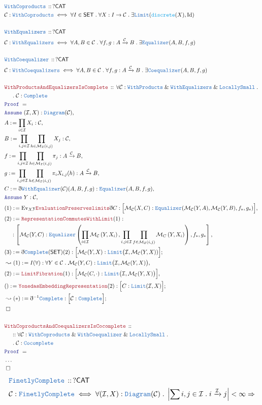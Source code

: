 \documentclass[12pt]{scrartcl}
\newcommand{\TYPE}[1]{\textcolor{NavyBlue}{\mathtt{#1}}}
\newcommand{\FUNC}[1]{\textcolor{Cerulean}{\mathtt{#1}}}
\newcommand{\LOGIC}[1]{\textcolor{Blue}{\mathtt{#1}}}
\newcommand{\THM}[1]{\textcolor{Maroon}{\mathtt{#1}}}
\renewcommand{\.}{\; . \;}
\newcommand{\de}{: \kern 0.1pc =}
\newcommand{\Theorem}[2]{& \THM{#1} \, :: \, #2 \\ & \Proof = \\ }
\newcommand{\DeclareType}[2]{& \TYPE{#1} \, :: \, #2 \\}
\newcommand{\DefineType}[3]{& #1 : \TYPE{#2} \iff #3 \\}
\newcommand{\NewLine}{\\ & \kern 1pc}
\newcommand{\Page}[1]{ \begin{align*} #1 \end{align*}   }
\newcommand{ \bd }{ \ByDef }
\newcommand{\NoProof}{ & \ldots \\ \EndProof}
\renewcommand{\And}{\; \& \;}
\newcommand{\Mor}{\mathcal{M}}
\newcommand{\Arrow}{\xrightarrow}
\newcommand{\Say}[3]{& #1 \de #2 : #3, \\}
\newcommand{\Conclude}[3]{& #1 \de #2 : #3; \\}
\newcommand{\Derive}[3]{& \leadsto #1 \de #2 : #3, \\}
\newcommand{\DeriveConclude}[3]{& \leadsto #1 \de #2 : #3 ; \\}
\newcommand{\Assume}[2]{& \LOGIC{Assume} \; #1 : #2, \\}
\newcommand{\QED}{\; \square}
\newcommand{\EndProof}{& \QED \\}
\newcommand{\ByDef}{\eth}
\newcommand{\Proof}{\LOGIC{Proof} \; }
\newcommand{\C}{\mathcal{C}}
\newcommand{\I}{\mathcal{I}}
\newcommand{\CAT}{\mathsf{CAT}}
\newcommand{\SET}{\mathsf{SET}}
\begin{document}
\Page{
	\DeclareType{WithCoproducts}{?\CAT}
	\DefineType{\C}{WithCoproducts}{
		\forall I \in \SET \.
		\forall X : I \to \C \.
		\exists \TYPE{Limit}(\FUNC{discrete}(X),\mathrm{Id})
	}
	\\
	\DeclareType{WithEqualizers}{?\CAT}
	\DefineType{\C}{WithEqualizers}{
		\forall A,B \in \C \. 
		\forall f,g : A \Arrow{\C} B \.
		\exists \TYPE{Equalizer}(A,B,f,g)
	}
	\\
	\DeclareType{WithCoequalizer}{?\CAT}
	\DefineType{\C}{WithCoequalizers}{
		\forall A,B \in \C \.
		\forall f,g : A \Arrow{\C} B \.
		\exists \TYPE{Coequalizer}(A,B,f,g)
	}
	\\
	\Theorem{WithProductsAndEqualizersIsComplete}
	{
		\forall \C : \TYPE{WithProducts} \And \TYPE{WithEqualizers} \And \TYPE{LocallySmall} \.
		\NewLine \.
		\C : \TYPE{Complete}
	}
	\Assume{(\I,X)}{\TYPE{Diagram}(\C)}
	\Say{A}{\prod_{i \in \I} X_i}{\C}
	\Say{B}{\prod_{i,j \in \I} \prod_{h \in \Mor_\I(i,j)} X_j  }{\C}
	\Say{f}{ \prod_{i,j \in \I} \prod_{h \in \Mor_\I(i,j)} \pi_j  }{ A \Arrow{\C} B}
	\Say{g}{\prod_{i,j \in \I} \prod_{h \in \Mor_\I(i,j)} \pi_iX_{i,j}(h)}{A \Arrow{\C} B}
	\Say{C}{\bd \TYPE{WithEqualizer}(\C)(A,B,f,g)}{\TYPE{Equalizer}(A,B,f,g)}
	\Assume{Y}{\C}
	\Say{(1)}{\mathrm{Ev}_X \mathrm{y} \THM{EvaluationPreserveslimits} \bd C}
	{ \Big[ \Mor_{\C}(X,C) : \TYPE{Equalizer}( \Mor_{\C}(Y,A),\Mor_{\C}(Y,B),f_*,g_*  ) \Big]  }
	\Say{(2)}{\THM{RepresentationCommutesWithLimit}(1)}
	{ \NewLine : \left[ \Mor_{\C}(Y,C) : \TYPE{Equalizer}\left( \prod_{i \in \I }\Mor_{\C}\left(  Y,X_i \right),
	    \prod_{i,j \in \I} \prod_{f \in \Mor_\I(i,j)}  \Mor_{C}\left( Y,X_i\right) \right),  
	   f_*,g_*   \right] }
	\Conclude{(3)}{\bd \TYPE{Complete}(\SET)(2)}{\Big[ \Mor_\C(Y,X) : \TYPE{Limit}\big( \I, \Mor_\C(Y,X)) \Big]}
	\Derive{(1)}{I(\forall)}{\forall Y \in \C \. \Mor_\C(Y,C) : \TYPE{Limit}\big(\I,\Mor_\C(Y,X)\big)  }
	\Say{(2)}{\THM{LimitFibration}(1)}{\Big[ \Mor_\C(C,\cdot) : \TYPE{Limit}\big(\I,\Mor_\C(Y,X)\big) \Big] }
	\Conclude{()}{\THM{YonedasEmbeddingRepresentation}(2)}{\Big[ C : \TYPE{ Limit }(\I, X) \Big]}
	\DeriveConclude{(*)}{\bd^{-1} \TYPE{Complete}}{\Big[ \C : \TYPE{Complete} \Big]}
	\EndProof
	\\
	\Theorem{WithCoproductsAndCoequalizersIsCocomplete}
	{
		\NewLine  ::
		\forall \C : \TYPE{WithCoproducts} \And \TYPE{WithCoequalizer} \And \TYPE{LocallySmall} \.
		\NewLine \.
		\C : \TYPE{Cocomplete}
	}
	\NoProof
} \Page{
	\DeclareType{FinetlyComplete}{?\CAT}
	\DefineType{\C}{FinetlyComplete}{
		\forall (\I,X) : \TYPE{Diagram}(\C) \.  
		\left| \sum i,j \in \I \.   i \Arrow{\I} j  \right| < \infty \Rightarrow
}}
\end{document}
